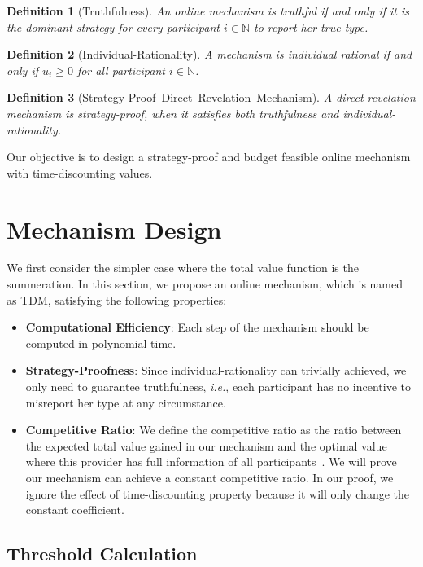 \documentclass[10pt,journal,letterpaper,compsoc]{IEEEtran}
\newtheorem{definition}{Definition}
\newcommand{\ie}{{\em i.e.}}
\begin{document}
\begin{definition}[Truthfulness]
An online mechanism is truthful if and only if it is the dominant strategy for every participant $i \in \mathbb{N}$ to report her true type.
\end{definition}

\begin{definition}[Individual-Rationality]
A mechanism is individual rational if and only if $u_i \ge 0$ for all participant $i \in \mathbb{N}$.
\end{definition}

\begin{definition}[Strategy-Proof\ Direct\ Revelation\ Mechanism]
A direct revelation mechanism is strategy-proof, when it satisfies both truthfulness and individual-rationality.
\end{definition}

Our objective is to design a strategy-proof and budget feasible online mechanism with time-discounting values.

\section{Mechanism Design}
We first consider the simpler case where the total value function is the summeration. In this section, we propose an online mechanism, which is named as TDM, satisfying the following properties:
\begin{itemize}
\item \textbf{Computational Efficiency}: Each step of the mechanism should be computed in polynomial time.

\item \textbf{Strategy-Proofness}: Since individual-rationality can trivially achieved, we only need to guarantee truthfulness, \ie, each participant has no incentive to misreport her type at any circumstance.

\item \textbf{Competitive Ratio}: We define the competitive ratio as the ratio between the expected total value gained in our mechanism and the optimal value where this provider has full information of all participants~\cite{zhao2014crowdsource}. We will prove our mechanism can achieve a constant competitive ratio. In our proof, we ignore the effect of time-discounting property because it will only change the constant coefficient.
\end{itemize}

\subsection{Threshold Calculation}
\end{document}
